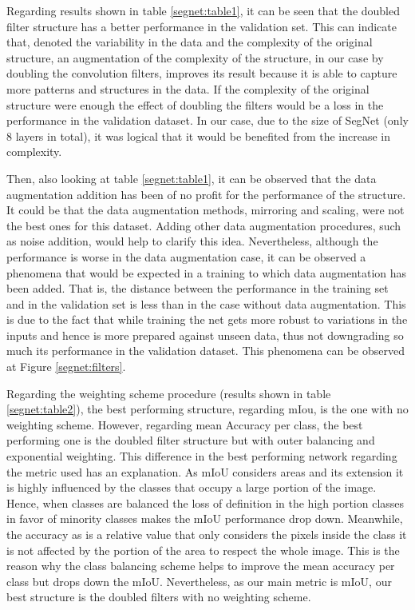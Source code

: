 \documentclass[12pt,a4paper]{article}
\begin{document}
Regarding results shown in table \ref{segnet:table1}, it can be seen that the doubled filter structure has a better performance in the validation set. This can indicate that, denoted the variability in the data and the complexity of the original structure, an augmentation of the complexity of the structure, in our case by doubling the convolution filters, improves its result because it is able to capture more patterns and structures in the data. If the complexity of the original structure were enough the effect of doubling the filters would be a loss in the performance in the validation dataset. In our case, due to the size of SegNet (only 8 layers in total), it was logical that it would be benefited from the increase in complexity.\newline

Then, also looking at table \ref{segnet:table1}, it can be observed that the data augmentation addition has been of no profit for the performance of the structure. It could be that the data augmentation methods, mirroring and scaling, were not the best ones for this dataset. Adding other data augmentation procedures, such as noise addition, would help to clarify this idea. Nevertheless, although the performance is worse in the data augmentation case, it can be observed a phenomena that would be expected in a training to which data augmentation has been added. That is, the distance between the performance in the training set and in the validation set is less than in the case without data augmentation. This is due to the fact that while training the net gets more robust to variations in the inputs and hence is more prepared against unseen data, thus not downgrading so much its performance in the validation dataset. This phenomena can be observed at Figure \ref{segnet:filters}.\newline

Regarding the weighting scheme procedure (results shown in table \ref{segnet:table2}), the best performing structure, regarding mIou, is the one with no weighting scheme. However, regarding mean Accuracy per class, the best performing one is the doubled filter structure but with outer balancing and exponential weighting. This difference in the best performing network regarding the metric used has an explanation. As mIoU considers areas and its extension it is highly influenced by the classes that occupy a large portion of the image. Hence, when classes are balanced the loss of definition in the high portion classes in favor of minority classes makes the mIoU performance drop down. Meanwhile, the accuracy as is a relative value that only considers the pixels inside the class it is not affected by the portion of the area to respect the whole image. This is the reason why the class balancing scheme helps to improve the mean accuracy per class but drops down the mIoU. Nevertheless, as our main metric is mIoU, our best structure is the doubled filters with no weighting scheme.\newline
\end{document}
